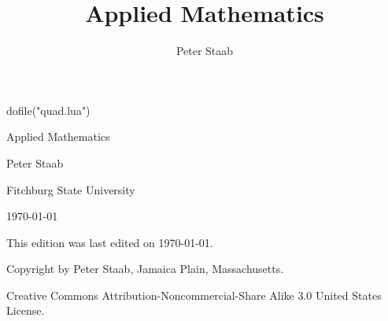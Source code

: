 \documentclass[display=portrait]{mathbook}
\title{Applied Mathematics}
\author{Peter Staab}
\begin{document}
\begin{titlepage}

\begin{luacode}
dofile("quad.lua")
\end{luacode}


\begin{center}
{  
Applied Mathematics }

\vspace{0.5in}

{  Peter Staab}

\vspace{0.25in}


{ Fitchburg State University} 
 
\vfill
 
{ \sffamily \today}
 
\end{center}
 
\end{titlepage}

\vfill 


This edition was last edited on \today.

Copyright by Peter Staab, Jamaica Plain, Massachusetts. 
 
Creative Commons Attribution-Noncommercial-Share Alike 3.0  United States \linebreak License.



 
\frontmatter
\setcounter{tocdepth}{1}

\tableofcontents

\mainmatter

% 








%

\printindex
\end{document}
